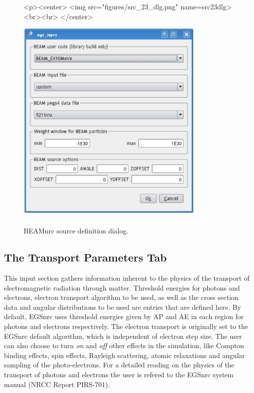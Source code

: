 \documentclass[12pt,twoside]{article}   %
\begin{document}
\begin{figure}[htb]
\begin{htmlonly}
\begin{rawhtml}
<p><center>
<img src="figures/src_23_dlg.png" name=src23dlg><br><br>
</center>
\end{rawhtml}
\end{htmlonly}
\begin{latexonly}
\begin{center}
\includegraphics[height=10cm]{figures/src_23_dlg}
\end{center}
\end{latexonly}
\begin{center}
\includegraphics[height=1mm]{figures/fake2}
\end{center}
\caption{BEAMnrc source definition dialog.}
\label{src23_dlg}
\end{figure}

\clearpage
\subsection{The Transport Parameters Tab}

This input section gathers information inherent to the physics of the transport of electromagnetic 
radiation through matter. Threshold energies for photons and electrons, electron transport algorithm 
to be used, as well as the cross section data and angular distributions to be used are entries that
are defined here. By default, EGSnrc uses threshold energies given by AP and AE in each region
for photons and electrons respectively. The electron transport is originally set to the EGSnrc default
algorithm, which is independent of electron step size. The user can also choose to turn {\em on}
and {\em off} other effects in the simulation, like Compton binding effects, spin effects, Rayleigh 
scattering, atomic relaxations and angular sampling of the photo-electrons. For a detailed 
reading on the physics of the transport of photons and electrons the user is refered to the 
EGSnrc system manual (NRCC Report PIRS-701\cite{Ka09a}).\\
\end{document}
